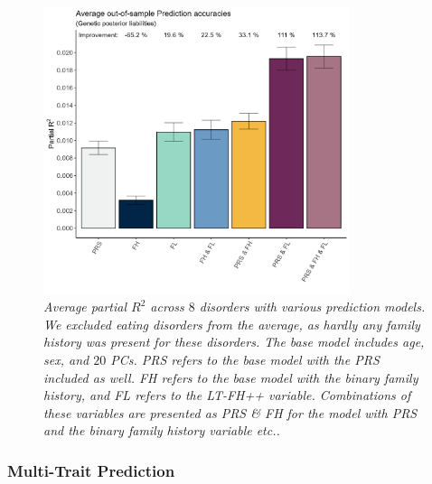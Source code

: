 \begin{figure}[h]
	\centering
	\includegraphics[width=0.8\textwidth]{results/Average_out-of-sample_partial_correlations_without_eating_disorders.jpeg}
	\caption[Average out-of-sample prediction across $ 8 $ disorders]{
		\sl Average partial $ R^2 $ across $ 8 $ disorders with various prediction models. We excluded eating disorders from the average, as hardly any family history was present for these disorders. The base model includes age, sex, and $ 20 $ PCs. \textit{PRS} refers to the base model with the PRS included as well. \textit{FH} refers to the base model with the binary family history, and \textit{FL} refers to the LT-FH++ variable. Combinations of these variables are presented as \textit{PRS} \& \textit{FH} for the model with PRS and the binary family history variable etc..}
	\label{fig:paper3:predictionResults}
\end{figure}


\subsubsection{Multi-Trait Prediction}

